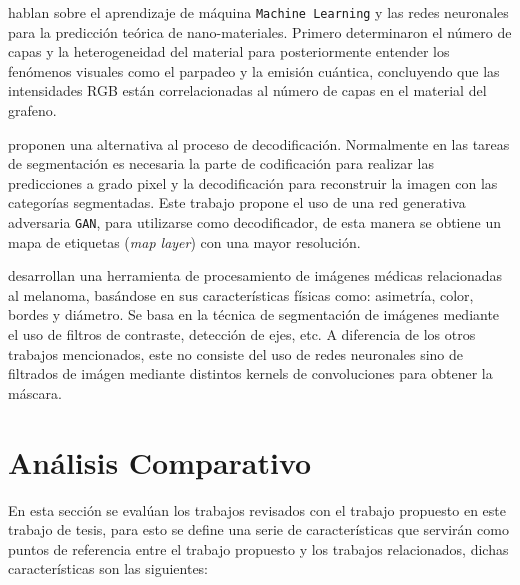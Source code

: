 \citet{zhou2019emerging} hablan sobre el aprendizaje de máquina \texttt{Machine Learning} y las redes neuronales para la predicción teórica de nano-materiales. Primero determinaron el número de capas y la heterogeneidad del material para posteriormente entender los fenómenos visuales como el parpadeo y la emisión cuántica, concluyendo que las intensidades RGB están correlacionadas al número de capas en el material del grafeno. 

\citet{DBLP:journals/corr/LucCCV16} proponen una alternativa al proceso de decodificación. Normalmente en las tareas de segmentación es necesaria la parte de codificación para realizar las predicciones a grado pixel y la decodificación para reconstruir la imagen con las categorías segmentadas. Este trabajo propone el uso de una red generativa adversaria \texttt{GAN}, para utilizarse como decodificador, de esta manera se obtiene un mapa de etiquetas (\emph{map layer}) con una mayor resolución.

\citet{JAIN2015735} desarrollan una herramienta de procesamiento de imágenes médicas relacionadas al melanoma, basándose en sus características físicas como: asimetría, color, bordes y diámetro. Se basa en la técnica de segmentación de imágenes mediante el uso de filtros de contraste, detección de ejes, etc. A diferencia de los otros trabajos mencionados, este no consiste del uso de redes neuronales sino de filtrados de imágen mediante distintos kernels de convoluciones para obtener la máscara.

\section{Análisis Comparativo}
En esta sección se evalúan los trabajos revisados con el trabajo propuesto en este trabajo de tesis, para esto se define una serie de características que servirán como puntos de referencia entre el trabajo propuesto y los trabajos relacionados, dichas características son las siguientes:

